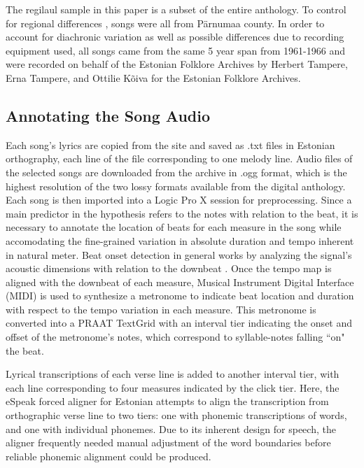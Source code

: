 
The regilaul sample in this paper is a subset of the entire anthology. To control for regional differences \citep{whyRegion},  songs were all from Pärnumaa county. In order to account for diachronic variation \citep{whyDecade} as well as possible differences due to recording equipment used, all songs came from the same 5 year span from 1961-1966 and were recorded on behalf of the Estonian Folklore Archives by Herbert Tampere, Erna Tampere, and Ottilie Kõiva for the Estonian Folklore Archives\citep{oras2002, tampere2016}. 




\subsection{Annotating the Song Audio }

 Each song's lyrics are copied from the site and saved as .txt files in Estonian orthography, each line of the file corresponding to one melody line.  
Audio files of the selected songs are downloaded from the archive in .ogg format, which is the highest resolution of the two lossy formats available from the digital anthology. Each song is then imported into a Logic Pro X \citep{logic2014} session for preprocessing. 
Since a main predictor in the hypothesis refers to the notes with relation to the beat, it is necessary to annotate the location of beats for each measure in the song while accomodating the fine-grained variation in absolute duration and tempo inherent in natural meter. 
Beat onset detection in general works by analyzing the signal's acoustic dimensions with relation to the downbeat \citep{bKeeper2007}. 
Once the tempo map is aligned with the downbeat of each measure, Musical Instrument Digital Interface (MIDI) is used to synthesize a metronome to indicate beat location and duration with respect to the tempo variation in each measure. This metronome is converted into a PRAAT\citep{boersna2022} TextGrid with an interval tier indicating the onset and offset of the metronome's notes, which correspond to syllable-notes falling ``on" the beat. 


 
Lyrical transcriptions of each verse line is added to another interval tier, with each line corresponding to four measures indicated by the click tier.  Here, the eSpeak forced aligner for Estonian \citep{eSpeak1995} attempts to align the transcription from orthographic verse line to two tiers: one with phonemic transcriptions of words, and one with individual phonemes. Due to its inherent design for speech, the aligner frequently needed manual adjustment of the word boundaries before reliable phonemic alignment could be produced. 

